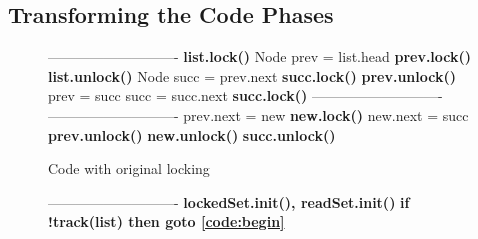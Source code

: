 \subsection{Transforming the Code Phases}\label{ssec:transformation}

\newcommand{\spOne}{\hspace{-3mm}\ }
\newcommand{\spZero}{\hspace{-3mm}}
\begin{figure*}
\codesize
	\begin{center}
	\begin{subfigure}[b]{.45\textwidth}
		\begin{algorithmic}[1]{}
		{\ttfamily
			 \label{code:begin}
			\Statex ----------------------------
			\State                               \label{code:beginRead}
            \State{\spOne}\textbf{list.lock()}
			\State{\spOne}Node prev = list.head
			\State{\spOne}\textbf{prev.lock()}
            \State{\spOne}\textbf{list.unlock()}
			\State{\spOne}Node succ = prev.next
			\State{\spOne}\textbf{succ.lock()}
			\State{\spOne}\textbf{prev.unlock()}
			\State{\spZero}prev = succ
			\State{\spZero}succ = succ.next
			\State{\spZero}\textbf{succ.lock()}  \label{code:endRead}
			\Statex ----------------------------
			\State                               \label{code:beginValidation}
			\State
			\State
			\State
			\State
			\State
            \State                               \label{code:endValidation}
			\Statex ----------------------------
			\State{\spZero}prev.next = new       \label{code:beginUpdate}
			\State{\spZero}\textbf{new.lock()}
			\State{\spZero}new.next = succ
            \State
			\State{\spZero}\textbf{prev.unlock()}
            \State
			\State{\spZero}\textbf{new.unlock()}
            \State
			\State{\spZero}\textbf{succ.unlock()}  \label{code:endUpdate}
			\EndFunction
			}
		\end{algorithmic}
		\caption{Code with original locking} \label{figure:transformation:before}
	\end{subfigure}
	\begin{subfigure}[b]{.45\textwidth}
		\begin{algorithmic}[1]{}
		{\ttfamily
			 \label{code:begin}
			\Statex ----------------------------
			\Comment{\textrm{read-only phase}}
            \State{\spOne}\textbf{lockedSet.init(), readSet.init()} \label{code:initSets}
            \State{\spOne}\textbf{if !track(list)  then {goto} \ref{code:begin}} \label{code:readGhaseGoto0}
}
\end{algorithmic}
\end{subfigure}
\end{center}
\end{figure*}
